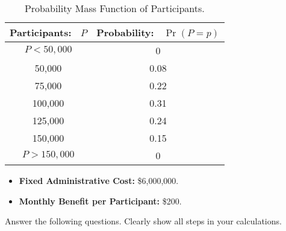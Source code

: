 \documentclass{article}
\begin{document}
\begin{table}[h!]
\centering
\begin{tabular}{c|c}
\hline
Participants: \ $P$ & Probability: \ $\Pr(P = p)$ \\
\hline
$P < 50,000$ & 0 \\ 50,000 & 0.08 \\ 75,000 & 0.22 \\ 100,000 & 0.31 \\ 125,000 & 0.24 \\ 150,000 & 0.15 \\ $P > 150,000$ & 0 \\
\hline
\end{tabular}
\caption{Probability Mass Function of Participants.}
\end{table}

\begin{itemize}
\item \textbf{Fixed Administrative Cost:} \$6,000,000.
\item \textbf{Monthly Benefit per Participant:} \$200.
\end{itemize}

\noindent Answer the following questions. Clearly show all steps in your calculations.
\end{document}
